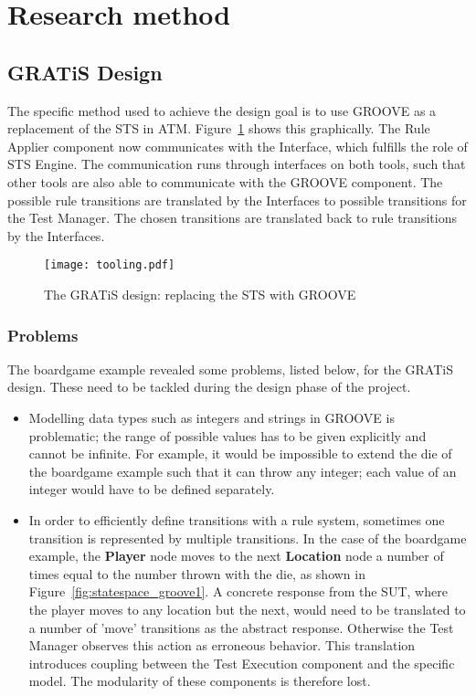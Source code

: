 \section{Research method}\label{sec:research_methods}

\subsection{GRATiS Design}
The specific method used to achieve the design goal is to use GROOVE as a replacement of the STS in ATM. Figure~\ref{fig:tooling} shows this graphically. The Rule Applier component now communicates with the Interface, which fulfills the role of STS Engine. The communication runs through interfaces on both tools, such that other tools are also able to communicate with the GROOVE component. The possible rule transitions are translated by the Interfaces to possible transitions for the Test Manager. The chosen transitions are translated back to rule transitions by the Interfaces.

\begin{figure}[h]
  \begin{center}
    \texttt{[image: tooling.pdf]}
  \end{center}
  \caption{The GRATiS design: replacing the STS with GROOVE}
  \label{fig:tooling}
\end{figure}

\subsubsection{Problems}\label{sec:problems}
The boardgame example revealed some problems, listed below, for the GRATiS design. These need to be tackled during the design phase of the project. 
\begin{itemize}
  \item Modelling data types such as integers and strings in GROOVE is problematic; the range of possible values has to be given explicitly and cannot be infinite. For example, it would be impossible to extend the die of the boardgame example such that it can throw any integer; each value of an integer would have to be defined separately.
  \item In order to efficiently define transitions with a rule system, sometimes one transition is represented by multiple transitions. In the case of the boardgame example, the \textbf{Player} node moves to the next \textbf{Location} node a number of times equal to the number thrown with the die, as shown in Figure~\ref{fig:statespace_groove1}. A concrete response from the SUT, where the player moves to any location but the next, would need to be translated to a number of 'move' transitions as the abstract response. Otherwise the Test Manager observes this action as erroneous behavior. This translation introduces coupling between the Test Execution component and the specific model. The modularity of these components is therefore lost. %
\end{itemize}

